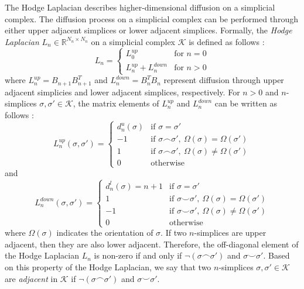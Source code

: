 \documentclass[10pt, letterpaper]{article}
\begin{document}
The Hodge Laplacian describes higher-dimensional diffusion on a simplicial complex. The diffusion process on a simplicial complex can be performed through either upper adjacent simplices or lower adjacent simplices. Formally, the \textit{Hodge Laplacian} $L_n\in\mathbb{R}^{N_{n}\times N_{n}}$ on a simplicial complex $\mathcal{K}$ is defined as follows \cite{Baccini2022, Krishnagopal2021, Lim2020}:
\begin{equation}
L_n = \begin{cases}
L^{up}_{0} & \text{for } n=0 \\
L^{up}_{n}+L^{down}_{n} & \text{for } n>0
\end{cases}
\end{equation}
where $L^{up}_{n}=B_{n+1}B_{n+1}^{T}$ and $L^{down}_{n}=B_{n}^{T}B_{n}$ represent diffusion through upper adjacent simplicies and lower adjacent simplices, respectively. For $n>0$ and $n$-simplices $\sigma, \sigma'\in\mathcal{K}$, the matrix elements of $L^{up}_{n}$ and $L^{down}_{n}$ can be written as follows \cite{Muhammad2006}:
\begin{equation}
L^{up}_{n}(\sigma,\sigma') = \begin{cases}
d^{u}_{n}(\sigma) & \text{if } \sigma=\sigma' \\
-1 & \text{if } \sigma\frown\sigma',~\Omega(\sigma)=\Omega(\sigma') \\
1 & \text{if } \sigma\frown\sigma',~\Omega(\sigma)\neq\Omega(\sigma') \\
0 & \text{otherwise}
\end{cases}
\end{equation}
and
\begin{equation}
L^{down}_{n}(\sigma,\sigma') = \begin{cases}
d^{l}_{n}(\sigma) = n+1 & \text{if } \sigma=\sigma' \\
1 & \text{if } \sigma\smile\sigma',~\Omega(\sigma)=\Omega(\sigma') \\
-1 & \text{if } \sigma\smile\sigma',~\Omega(\sigma)\neq\Omega(\sigma') \\
0 & \text{otherwise}
\end{cases}
\end{equation}
where $\Omega(\sigma)$ indicates the orientation of $\sigma$. If two $n$-simplices are upper adjacent, then they are also lower adjacent. Therefore, the off-diagonal element of the Hodge Laplacian $L_n$ is non-zero if and only if $\neg(\sigma\frown\sigma')$ and $\sigma\smile\sigma'$. Based on this property of the Hodge Laplacian, we say that two $n$-simplices $\sigma, \sigma'\in\mathcal{K}$ are \textit{adjacent} in $\mathcal{K}$ if $\neg(\sigma\frown\sigma')$ and $\sigma\smile\sigma'$.
\end{document}
